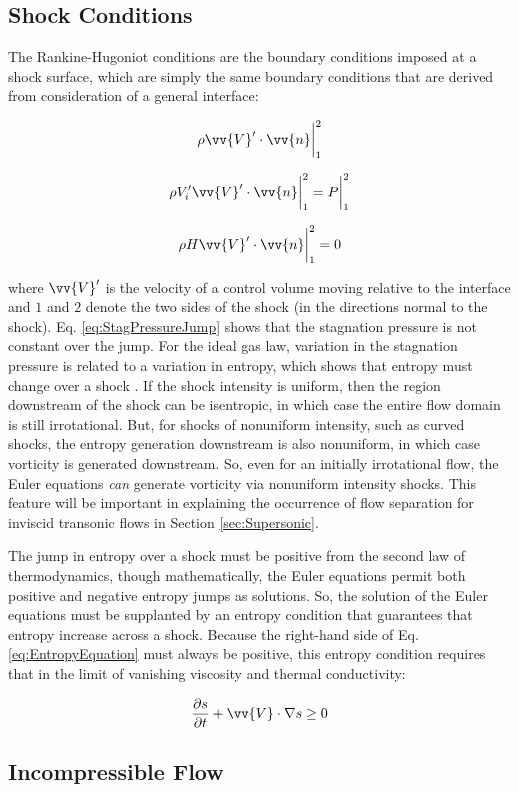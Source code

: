 \documentclass[10pt]{article}
\newcommand{\beq}{\begin{equation}}
\newcommand{\eeq}{\end{equation}}
\begin{document}
\begin{flushleft}
\subsection{Shock Conditions}

The Rankine-Hugoniot conditions are the boundary conditions imposed at a shock surface, which are simply the same boundary conditions that are derived from consideration of a general interface:

\beq
\rho\vv{V}'\cdot\vv{n}\biggr\lvert_{1}^{2}
\eeq

\beq
\label{eq:StagPressureJump}
\rho V_i'\vv{V}'\cdot\vv{n}\biggr\rvert_{1}^2=P\biggr\rvert_{1}^2
\eeq

\beq
\rho H\vv{V}'\cdot\vv{n}\biggr\rvert_{1}^2=0
\eeq

where \(\vv{V}'\) is the velocity of a control volume moving relative to the interface and \(1\) and \(2\) denote the two sides of the shock (in the directions normal to the shock). Eq. \eqref{eq:StagPressureJump} shows that the stagnation pressure is not constant over the jump. For the ideal gas law, variation in the stagnation pressure is related to a variation in entropy, which shows that entropy must change over a shock \cite{hirsch}. If the shock intensity is uniform, then the region downstream of the shock can be isentropic, in which case the entire flow domain is still irrotational. But, for shocks of nonuniform intensity, such as curved shocks, the entropy generation downstream is also nonuniform, in which case vorticity is generated downstream. So, even for an initially irrotational flow, the Euler equations {\it can} generate vorticity via nonuniform intensity shocks. This feature will be important in explaining the occurrence of flow separation for inviscid transonic flows in Section \ref{sec:Supersonic}.

The jump in entropy over a shock must be positive from the second law of thermodynamics, though mathematically, the Euler equations permit both positive and negative entropy jumps as solutions. So, the solution of the Euler equations must be supplanted by an entropy condition that guarantees that entropy increase across a shock. Because the right-hand side of Eq. \eqref{eq:EntropyEquation} must always be positive, this entropy condition requires that in the limit of vanishing viscosity and thermal conductivity:

\beq
\frac{\partial s}{\partial t}+\vv{V}\cdot\nabla s\geq0
\eeq

\subsection{Incompressible Flow}


\end{flushleft}
\end{document}
